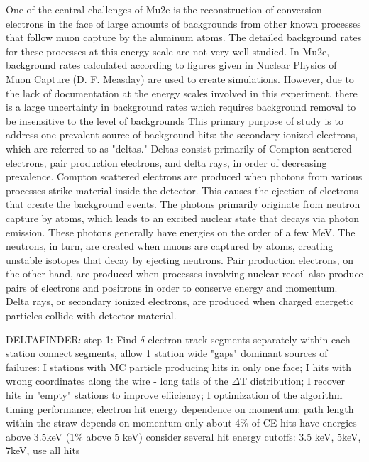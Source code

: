 \iffalse

One of the central challenges of Mu2e is the reconstruction of conversion electrons in the face of
large amounts of backgrounds from other known processes that follow muon capture by the
aluminum atoms. The detailed background rates for these processes at this energy scale are not very
well studied. In Mu2e, background rates calculated according to figures given in Nuclear Physics of
Muon Capture (D. F. Measday) are used to create simulations. However, due to the lack of
documentation at the energy scales involved in this experiment, there is a large uncertainty in
background rates which requires background removal to be insensitive to the level of backgrounds
This primary purpose of study is to address one prevalent source of background hits: the
secondary ionized electrons, which are referred to as "deltas." Deltas consist primarily of Compton
scattered electrons, pair production electrons, and delta rays, in order of decreasing prevalence.
Compton scattered electrons are produced when photons from various processes strike material
inside the detector. This causes the ejection of electrons that create the background events. The
photons primarily originate from neutron capture by atoms, which leads to an excited nuclear state
that decays via photon emission. These photons generally have energies on the order of a few MeV.
The neutrons, in turn, are created when muons are captured by atoms, creating unstable isotopes that
decay by ejecting neutrons. Pair production electrons, on the other hand, are produced when
processes involving nuclear recoil also produce pairs of electrons and positrons in order to conserve
energy and momentum. Delta rays, or secondary ionized electrons, are produced when charged
energetic particles collide with detector material.






DELTAFINDER:
step 1: Find $\delta$-electron track segments separately within each station
connect segments, allow 1 station wide "gaps"
dominant sources of failures:
I stations with MC particle producing hits in only one face;
I hits with wrong coordinates along the wire - long tails of the $\Delta$T distribution;
I recover hits in "empty" stations to improve efficiency;
I optimization of the algorithm timing performance;
electron hit energy dependence on momentum: path length within the straw depends on momentum
only about 4\% of CE hits have energies above 3.5keV (1\% above 5 keV)
consider several hit energy cutoffs: 3.5 keV, 5keV, 7keV, use all hits




